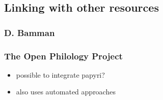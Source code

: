 
\subsection{Linking with other resources}
\label{sec:linking}

\subsubsection{D. Bamman}
\cite{bammanpbml2008,bammantlt8,bammancrane2011}

\subsubsection{The Open Philology Project}
\begin{itemize}
\item possible to integrate papyri?
\item also uses automated approaches
\end{itemize}

